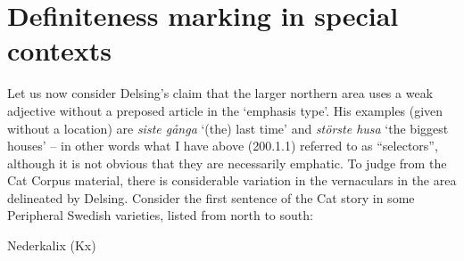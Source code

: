 \section{\rmfamily\bfseries Definiteness marking in special contexts}

\begin{styleBodyTextFirst}
Let us now consider Delsing’s claim that the larger northern area uses a weak adjective without a preposed article in the ‘emphasis type’. His examples (given without a location) are \textit{siste gånga} ‘(the) last time’ and \textit{störste husa} ‘the biggest houses’ – in other words what I have above (200.1.1) referred to as “selectors”, although it is not obvious that they are necessarily emphatic. To judge from the Cat Corpus material, there is considerable variation in the vernaculars in the area delineated by Delsing. Consider the first sentence of the Cat story in some Peripheral Swedish varieties, listed from north to south:

\end{styleBodyTextFirst}

\begin{listWWNumileveli}
\item 

\end{listWWNumileveli}

\begin{listWWNumlxxleveli}
\item 

\begin{styleExLtrTbl}
Nederkalix (Kx)

\end{styleExLtrTbl}

\end{listWWNumlxxleveli}

\begin{styleExText}

\end{styleExText}

